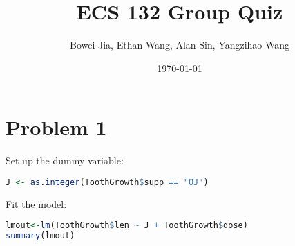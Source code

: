 \documentclass[11pt]{article}
\title{ECS 132 Group Quiz}
\author{Bowei Jia, Ethan Wang, Alan Sin, Yangzihao Wang}
\date{\today}
\newcommand{\matindex}[1]{\mbox{\scriptsize#1}}
\begin{document}
\maketitle

\begin{comment}
\begin{align*}
E(L_2) &= E(L_1 - A_2 + B_2) \\
&=E(L_1) - E(A_2) + E(B_2) \\
&=(0.4\times 1 + 0.1\times 2) \times 2 - E(A_2) \\
E(A_2) &= \sum_{c}P(L_1=c)E(A_2|L_1=c) \\
&=0 + 0.4E(A_2|L_1=1) + 0.1E(A_2|L_1=2) \\
&=0.4 \times 0.2 \times 1 + 0.1 \times (0.2 \times 0.8 \times \binom{2}{1} \times 1 + 0.2 \times 0.2 \times 2) \\
&= 0.12\\
E(L_2) &= 1.2 - 0.12 = 1.08
\end{align*}

First define the initial state matrix $P$:
\[
  P=\begin{blockarray}{c@{\hspace{5pt}}rrrr@{\hspace{5pt}}cl}
    & \matindex{1} & \matindex{2} & \matindex{3} & \matindex{4} & & \\
    \begin{block}{(c@{\hspace{5pt}}rrrr@{\hspace{5pt}}c)l}
      & 0 &  \frac{1}{3} & \frac{1}{3} & \frac{1}{3} & & \matindex{1} \\
      & 0 &  0 & \frac{2}{3} & \frac{1}{3} & & \matindex{2} \\
      & 0 &  \frac{1}{3} & \frac{1}{3} & \frac{1}{3} & & \matindex{3} \\
      & \frac{1}{3} &  \frac{1}{3} & \frac{1}{3} & 0 & & \matindex{4} \\
    \end{block}
  \end{blockarray}
\]
Reasoning:
\begin{itemize}
\item[At state 1:] 
\item[At state 2:] 
\item[At state 3:]
\item[At state 4:]
\end{itemize}
\end{comment}

\section*{Problem 1}
Set up the dummy variable:
\begin{lstlisting}[language=R]
J <- as.integer(ToothGrowth$supp == "OJ")
\end{lstlisting}
Fit the model:
\begin{lstlisting}[language=R]
lmout<-lm(ToothGrowth$len ~ J + ToothGrowth$dose)
summary(lmout)
\end{lstlisting}
\end{document}
